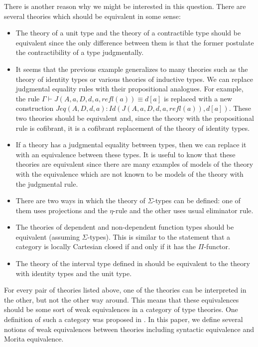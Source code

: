 \documentclass[reqno]{amsart}
\theoremstyle{definition}
\theoremstyle{remark}
\newcommand{\deq}{\equiv}
\newcommand{\Jeq}{\mathit{Jeq}}
\newcommand{\Id}{\mathit{Id}}
\newcommand{\refl}{\mathit{refl}}
\numberwithin{figure}{section}
\begin{document}
There is another reason why we might be interested in this question.
There are several theories which should be equivalent in some sense:
\begin{itemize}
\item The theory of a unit type and the theory of a contractible type should be equivalent since the only difference between them is that the former postulate the contractibility of a type judgmentally.
\item It seems that the previous example generalizes to many theories such as the theory of identity types or various theories of inductive types.
We can replace judgmental equality rules with their propositional analogues.
For example, the rule $\Gamma \vdash J(A,a,D,d,a,\refl(a)) \deq d[a]$ is replaced with a new construction $\Jeq(A,D,d,a) : \Id(J(A,a,D,d,a,\refl(a)),d[a])$.
These two theories should be equivalent and, since the theory with the propositional rule is cofibrant, it is a cofibrant replacement of the theory of identity types.
\item If a theory has a judgmental equality between types, then we can replace it with an equivalence between these types.
It is useful to know that these theories are equivalent since there are many examples of models of the theory with the equivalence which are not known to be models of the theory with the judgmental rule.
\item There are two ways in which the theory of $\Sigma$-types can be defined: one of them uses projections and the $\eta$-rule and the other uses usual eliminator rule.
\item The theories of dependent and non-dependent function types should be equivalent (assuming $\Sigma$-types). This is similar to the statement that a category is locally Cartesian closed if and only if it has the $\Pi$-functor.
\item The theory of the interval type defined in \cite{alg-models} should be equivalent to the theory with identity types and the unit type.
\end{itemize}

For every pair of theories listed above, one of the theories can be interpreted in the other, but not the other way around.
This means that these equivalences should be some sort of weak equivalences in a category of type theories.
One definition of such a category was proposed in \cite{alg-tt}.
In this paper, we define several notions of weak equivalences between theories including syntactic equivalence and Morita equivalence.
\end{document}
